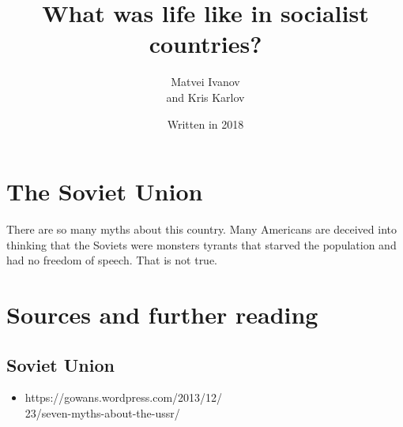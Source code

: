 \documentclass[a4paper]{book}%
\begin{document}
\fontsize{24}{28}\selectfont
\title{What was life like in socialist countries?}
\author{Matvei Ivanov \\ and Kris Karlov}
\date{Written in 2018}
\maketitle
\fontsize{24}{28}\selectfont
\chapter{The Soviet Union}
There are so many myths about this country. Many Americans are deceived into thinking that the Soviets were monsters tyrants that starved the population and had no freedom of speech. That is not true.

\chapter{Sources and further reading}
\section{Soviet Union}
\begin{itemize}
\item https://gowans.wordpress.com/2013/12/ \\
23/seven-myths-about-the-ussr/
\end{itemize}
\end{document}
